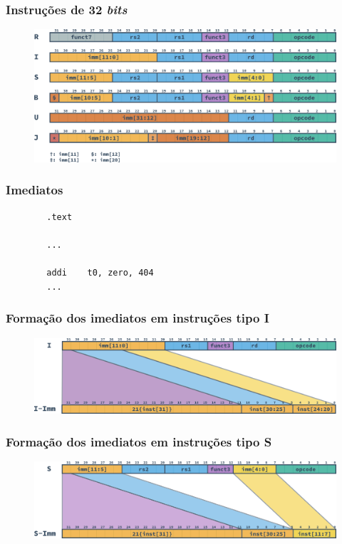 \documentclass[aspectratio=169]{beamer}
\begin{document}
    \begin{frame}
        \frametitle{Instruções de 32 \textit{bits}}
        \vfill
        \begin{figure}[H]
        \centering
            \includegraphics[width=.9\textwidth,height=.9\textheight,keepaspectratio]
            {../images/instructions/rv32_instructions.png}
        \end{figure}
        \vfill
    \end{frame}

    \begin{frame}[fragile]
        \frametitle{Imediatos}
        \vfill
        \begin{lstlisting}
        .text

        ...

        addi    t0, zero, 404
        ...
        \end{lstlisting}
        \vfill
    \end{frame}

    \begin{frame}
        \frametitle{Formação dos imediatos em instruções tipo \textbf{I}}
        \vfill
        \begin{figure}[H]
        \centering
            \includegraphics[width=.9\textwidth,height=.9\textheight,keepaspectratio]
            {../images/instructions/rv32_i_immediate.png}
        \end{figure}
        \vfill
    \end{frame}

    \begin{frame}
        \frametitle{Formação dos imediatos em instruções tipo \textbf{S}}
        \vfill
        \begin{figure}[H]
        \centering
            \includegraphics[width=.9\textwidth,height=.9\textheight,keepaspectratio]
            {../images/instructions/rv32_s_immediate.png}
        \end{figure}
        \vfill
    \end{frame}
\end{document}
